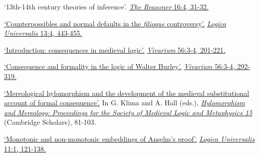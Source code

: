 	\item {}
{
	`13th-14th century theories of inference'. \href{http://blogs.kent.ac.uk/thereasoner/files/2022/05/TheReasoner-164.pdf}{\emph{The Reasoner} 16:4, 31-32.}
}
{}	
\item {}
{%
	\href{https://www.academia.edu/41385588/Counterpossibles_and_Normal_Defaults_in_the_Filioque_Controversy}{`Counterpossibles and normal defaults in the \emph{filioque} controversy'.} \href{https://link.springer.com/article/10.1007\%2Fs11787-019-00229-x}{\emph{Logica Universalis} 13:4, 443-455.}
}
{}
	\item {}
{}
{
	\href{https://www.academia.edu/38134285/Introduction_Consequences_in_Medieval_Logic}{`Introduction: consequences in medieval logic'.} \href{https://brill.com/view/journals/viv/56/3-4/article-p201_1.xml?language=en}{\emph{Vivarium} 56:3-4, 201-221.}}
{}
	\item \datedsubsectionnarrow{}
{}
{
	\href{https://www.academia.edu/38134091/Consequence_and_formality_in_the_logic_of_Walter_Burley}{`Consequence and formality in the logic of Walter Burley'.} \href{https://brill.com/view/journals/viv/56/3-4/article-p292_5.xml?language=en}{\emph{Vivarium} 56:3-4, 292-319.}}
{}
	\item \datedsubsectionnarrow{}
{}
{
	\href{https://www.academia.edu/36407777/Mereological_hylomorphism_and_the_development_of_the_medieval_substitutional_account_of_formal_consequence}{`Mereological hylomorphism and the development of the medieval substitutional account of formal consequence'.} In G. Klima and A. Hall (eds.), \href{https://www.cambridgescholars.com/product/978-1-5275-1163-7}{\emph{Hylomorphism and Mereology: Proceedings for the Society of Medieval Logic and Metaphysics 15}} (Cambridge Scholars), 81-103.}
{}
	\item {}
{}
{
	\href{https://www.academia.edu/29444391/Monotonic_and_non_monotonic_embeddings_of_Anselms_proof}{`Monotonic and non-monotonic embeddings of Anselm's proof'.} \href{https://link.springer.com/article/10.1007/s11787-017-0162-7}{\emph{Logica Universalis} 11:1, 121-138.}}
{}
